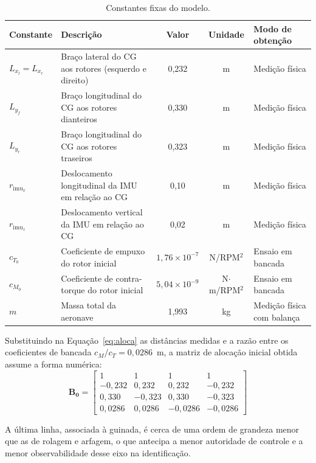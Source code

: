 \documentclass{ieeeaccess}
\begin{document}
\begin{table}[!htbp]
\caption{Constantes fixas do modelo.}
\label{tab:const_iniciais}
\centering
\begin{tabular}{llccl}
\toprule
\textbf{Constante} & \textbf{Descrição} & \textbf{Valor} & \textbf{Unidade} & \textbf{Modo de obtenção} \\
\midrule
$L_{x_l} = L_{x_r}$ & Braço lateral do CG aos rotores (esquerdo e direito) & 0,232 & m & Medição física \\
$L_{y_f}$ & Braço longitudinal do CG aos rotores dianteiros & 0,330 & m & Medição física \\
$L_{y_r}$ & Braço longitudinal do CG aos rotores traseiros & 0,323 & m & Medição física \\
$r_{\mathrm{imu}_x}$ & Deslocamento longitudinal da IMU em relação ao CG & 0,10 & m & Medição física \\
$r_{\mathrm{imu}_z}$ & Deslocamento vertical da IMU em relação ao CG & 0,02 & m & Medição física \\
$c_{T_0}$ & Coeficiente de empuxo do rotor inicial & $1{,}76\times10^{-7}$ & N/RPM$^2$ & Ensaio em bancada \\
$c_{M_0}$ & Coeficiente de contra-torque do rotor inicial & $5{,}04\times10^{-9}$ & N$\cdot$m/RPM$^2$ & Ensaio em bancada \\
$m$ & Massa total da aeronave & 1,993 & kg & Medição física com balança \\
\bottomrule
\end{tabular}
\end{table}

Substituindo na Equação~\eqref{eq:aloca} as distâncias medidas e a razão entre os coeficientes de bancada $c_M/c_T = 0{,}0286$~m, a matriz de alocação inicial obtida assume a forma numérica:
\begin{equation}
\mathbf{B_0}=
\begin{bmatrix}
1 & 1 & 1 & 1 \\
-0{,}232 & 0{,}232 & 0{,}232 & -0{,}232 \\
0{,}330 & -0{,}323 & 0{,}330 & -0{,}323 \\
0{,}0286 & 0{,}0286 & -0{,}0286 & -0{,}0286
\end{bmatrix}
\label{eq:aloca_num}
\end{equation}

A última linha, associada à guinada, é cerca de uma ordem de grandeza menor que as de rolagem e arfagem, o que antecipa a menor autoridade de controle e a menor observabilidade desse eixo na identificação.
\end{document}
